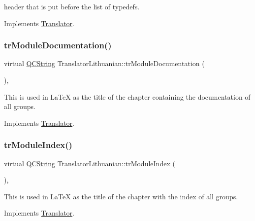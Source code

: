 header that is put before the list of typedefs. 

Implements \mbox{\hyperlink{class_translator}{Translator}}.

\mbox{\label{class_translator_lithuanian_a3c44becd4aaaf21c68c3b76cf9b74e42}} 
\subsubsection{\texorpdfstring{trModuleDocumentation()}{trModuleDocumentation()}}
{\footnotesize\ttfamily virtual \mbox{\hyperlink{class_q_c_string}{Q\+C\+String}} Translator\+Lithuanian\+::tr\+Module\+Documentation (\begin{DoxyParamCaption}{ }\end{DoxyParamCaption})\hspace{0.3cm}{\ttfamily [inline]}, {\ttfamily [virtual]}}

This is used in La\+TeX as the title of the chapter containing the documentation of all groups. 

Implements \mbox{\hyperlink{class_translator}{Translator}}.

\mbox{\label{class_translator_lithuanian_ac5729a7438def6bfd8a43a6792230f74}} 
\subsubsection{\texorpdfstring{trModuleIndex()}{trModuleIndex()}}
{\footnotesize\ttfamily virtual \mbox{\hyperlink{class_q_c_string}{Q\+C\+String}} Translator\+Lithuanian\+::tr\+Module\+Index (\begin{DoxyParamCaption}{ }\end{DoxyParamCaption})\hspace{0.3cm}{\ttfamily [inline]}, {\ttfamily [virtual]}}

This is used in La\+TeX as the title of the chapter with the index of all groups. 

Implements \mbox{\hyperlink{class_translator}{Translator}}.

\mbox{\label{class_translator_lithuanian_a77e87c7f7db6c5cd644df767c9420055}} 
